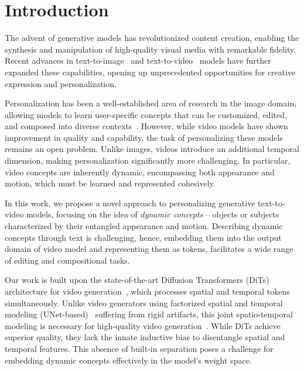 
\section{Introduction}




    
The advent of generative models has revolutionized content creation, enabling the synthesis and manipulation of high-quality visual media with remarkable fidelity. Recent advances in text-to-image~\cite{saharia2022photorealistic,ramesh2022hierarchical,rombach2022high} and text-to-video~\cite{bar2024lumiere} models have further expanded these capabilities, opening up unprecedented opportunities for creative expression and personalization.

Personalization has been a well-established area of research in the image domain, allowing models to learn user-specific concepts that can be customized, edited, and composed into diverse contexts~\cite{ruiz2023dreambooth,gal2022image}. However, while video models have shown improvement in quality and capability, the task of personalizing these models remains an open problem. Unlike images, videos introduce an additional temporal dimension, making personalization significantly more challenging. In particular, video concepts are inherently dynamic, encompassing both appearance and motion, which must be learned and represented cohesively.

In this work, we propose a novel approach to personalizing generative text-to-video models, focusing on the idea of \emph{dynamic concepts} -- objects or subjects characterized by their entangled appearance and motion. 
Describing dynamic concepts through text is challenging, hence, embedding them into the output domain of video model and representing them as tokens,  facilitates a wide range of editing and compositional tasks.


Our work is built upon the state-of-the-art Diffusion Transformers (DiTs) architecture for video generation~\cite{menapace2024snap,sora}, which processes spatial and temporal tokens simultaneously. Unlike video generators using factorized spatial and temporal modeling (UNet-based)~\cite{blattmann2023stable} suffering from rigid artifacts, this joint spatio-temporal modeling is necessary for high-quality video generation~\cite{sora}. While DiTs achieve superior quality, they lack the innate inductive bias to disentangle spatial and temporal features. This absence of built-in separation poses a challenge for embedding dynamic concepts effectively in the model’s weight space.

